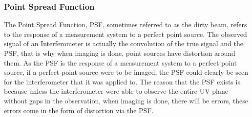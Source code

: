 \subsubsection{Point Spread Function}
The Point Spread Function, PSF, sometimes referred to as the dirty beam, refers to the response of a
measurement system to a perfect point source.\cite{TEXTBOOK} The observed signal of an Interferometer is
actually the convolution of the true signal and the PSF, that is why when imaging is done, point sources
have distortion around them. As the PSF is the response of a measurement system to a perfect point source,
if a perfect point source were to be imaged, the PSF could clearly be seen for the interferometer that it
was applied to. The reason that the PSF exists is because unless the interferometer were able to observe the entire UV plane without gaps in the observation, when imaging is done, there will be errors, these errors come in the form of distortion via the PSF.
